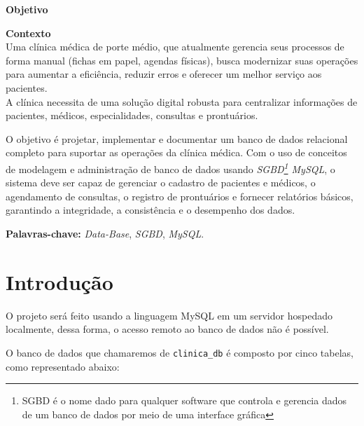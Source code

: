 \documentclass[a4paper,12pt]{article}
\newenvironment{objetivo}{
    \begin{center}
        \bfseries\large
        Objetivo
    \end{center}
    \vspace{1em}
    \itshape
}{}
\begin{document}
\begin{objetivo}
    \begin{center}
        \textbf{Contexto}\\
            Uma clínica médica de porte médio, que atualmente gerencia seus processos de forma manual (fichas em papel, agendas físicas), busca modernizar suas operações para aumentar a eficiência, reduzir erros e oferecer um melhor serviço aos pacientes.\\ 
            A clínica necessita de uma solução digital robusta para centralizar informações de pacientes, médicos, especialidades, consultas e prontuários. 
    \end{center}
    O objetivo é projetar, implementar e documentar um banco de dados relacional completo para suportar as operações da clínica médica. Com o uso de conceitos de modelagem e administração de banco de dados usando \textit{SGBD\footnote{SGBD é o nome dado para qualquer software que controla e gerencia dados de um banco de dados por meio de uma interface gráfica\cite{trybe}} MySQL}, o sistema deve ser capaz de gerenciar o cadastro de pacientes e médicos, o agendamento de consultas, o registro de prontuários e fornecer relatórios básicos, garantindo a integridade, a consistência e o desempenho dos dados.

    \vspace{0.5cm}
    \noindent \textbf{Palavras-chave:} \textit{Data-Base}, \textit{SGBD}, \textit{MySQL}.
\end{objetivo}

\newpage
\tableofcontents
\newpage




\section{Introdução}

O projeto será feito usando a linguagem MySQL em um servidor hospedado localmente, dessa forma, o acesso remoto ao banco de dados não é possível.

O banco de dados que chamaremos de \texttt{clinica\_db} é composto por cinco tabelas, como representado abaixo:
\end{document}
